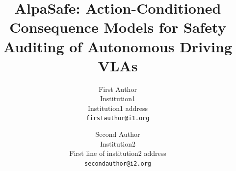 \documentclass[10pt,twocolumn,letterpaper]{article}
\title{AlpaSafe: Action-Conditioned Consequence Models
for Safety Auditing of Autonomous Driving VLAs}
\author{First Author\\
Institution1\\
Institution1 address\\
{\tt\small firstauthor@i1.org}
\and
Second Author\\
Institution2\\
First line of institution2 address\\
{\tt\small secondauthor@i2.org}
}
\begin{document}
\maketitle






% 
% 
{
    \small
    
    
}
\end{document}
